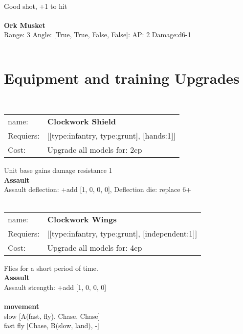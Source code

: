 \ \\
Good shot, +1 to hit\\ 

\ \\
{\bf Ork Musket } \\



Range: 3  Angle: [True, True, False, False]: AP: 2 Damage:d6-1 \\




 
\ \\

\section{Equipment and training Upgrades}\ \\
\begin{tabular}{ll}
name: & {\bf Clockwork Shield } \\
Requiers: & [[type:infantry, type:grunt], [hands:1]] \\
Cost: & Upgrade all models for: 2cp \\
\end{tabular}

Unit base gains damage resistance 1\\ 




{\bf Assault} \ \\
Assault deflection: +add [1, 0, 0, 0], Deflection die: replace 6+
\\ 




\ \\
\begin{tabular}{ll}
name: & {\bf Clockwork Wings } \\
Requiers: & [[type:infantry, type:grunt], [independent:1]] \\
Cost: & Upgrade all models for: 4cp \\
\end{tabular}

Flies for a short period of time.\\ 




{\bf Assault} \ \\
Assault strength: +add [1, 0, 0, 0] 
\\ 



\ \\ {\bf movement } \\
slow [A(fast, fly), Chase, Chase] \\
fast fly [Chase, B(slow, land), -] \\

